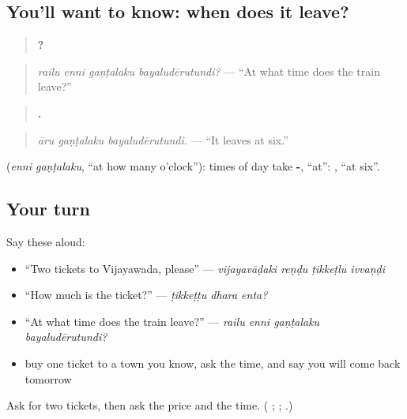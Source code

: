 \subsection*{You'll want to know: when does it leave?}
\begin{quote}
\textbf{   ?}
\end{quote}

\begin{quote}
\emph{railu enni gaṇṭalaku bayaludērutundi?} — \textquotedblleft{}At what time does the train leave?\textquotedblright{}
\end{quote}

\begin{quote}
\textbf{  .}
\end{quote}

\begin{quote}
\emph{āru gaṇṭalaku bayaludērutundi.} — \textquotedblleft{}It leaves at six.\textquotedblright{}
\end{quote}

\textbf{ } (\emph{enni gaṇṭalaku}, \textquotedblleft{}at how many o'clock\textquotedblright{}): times of day take \textbf{-}, \textquotedblleft{}at\textquotedblright{}: \textbf{ }, \textquotedblleft{}at six\textquotedblright{}.

\subsection*{Your turn}
Say these aloud:

\begin{itemize}
\raggedright
  \item \textquotedblleft{}Two tickets to Vijayawada, please\textquotedblright{} — \emph{vijayavāḍaki reṇḍu ṭikkeṭlu ivvaṇḍi}
  \item \textquotedblleft{}How much is the ticket?\textquotedblright{} — \emph{ṭikkeṭṭu dhara enta?}
  \item \textquotedblleft{}At what time does the train leave?\textquotedblright{} — \emph{railu enni gaṇṭalaku bayaludērutundi?}
  \item buy one ticket to a town you know, ask the time, and say you will come back tomorrow
\end{itemize}

\begin{tcolorbox}[breakable,colback=teal!4,colframe=teal!35!black,title={Before you move on}]
Ask for two tickets, then ask the price and the time. (\textbf{  }; \textbf{  }; \textbf{  }.)
\end{tcolorbox}
